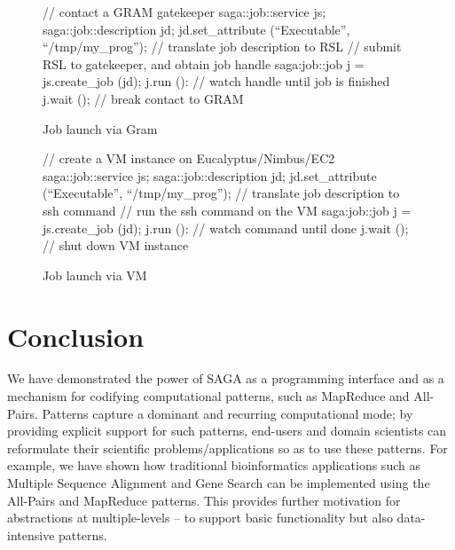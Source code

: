 \documentclass[conference,final]{IEEEtran}
\begin{document}
\begin{figure}[!ht]
 \begin{center}
  \begin{mycode}[label=SAGA Job Launch via GRAM gatekeeper]
   { // contact a GRAM gatekeeper
    saga::job::service     js;
    saga::job::description jd;
    jd.set_attribute (``Executable'', ``/tmp/my_prog'');
    // translate job description to RSL
    // submit RSL to gatekeeper, and obtain job handle
    saga:job::job j = js.create_job (jd);
    j.run ():
    // watch handle until job is finished
    j.wait ();
   } // break contact to GRAM
  \end{mycode}
  \caption{\label{gramjob}Job launch via Gram }
 \end{center}
\end{figure}


\begin{figure}[!ht]
 \begin{center}
  \begin{mycode}[label=SAGA create a VM instance on a Cloud]
   {// create a VM instance on Eucalyptus/Nimbus/EC2
    saga::job::service     js;
    saga::job::description jd;
    jd.set_attribute (``Executable'', ``/tmp/my_prog'');
    // translate job description to ssh command
    // run the ssh command on the VM
    saga:job::job j = js.create_job (jd);
    j.run ():
    // watch command until done
    j.wait ();
   } // shut down VM instance
  \end{mycode}
  \caption{\label{vmjob} Job launch via VM}
 \end{center}
\end{figure}


\section{Conclusion}
We have demonstrated the power of SAGA as a programming interface and
as a mechanism for codifying computational patterns, such as MapReduce
and All-Pairs.  Patterns capture a dominant and recurring
computational mode; by providing explicit support for such patterns,
end-users and domain scientists can reformulate their scientific
problems/applications so as to use these patterns. For example, we
have shown how traditional bioinformatics applications such as Multiple
Sequence Alignment and Gene Search can be implemented using the
All-Pairs and MapReduce patterns. This provides further motivation for
abstractions at multiple-levels -- to support basic functionality but
also data-intensive patterns.
\end{document}
